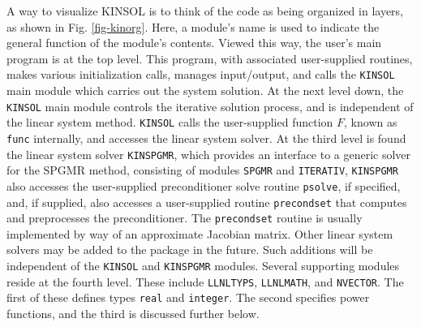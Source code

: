 A way to visualize KINSOL is to think of the code as being organized
in layers, as shown in Fig. \ref{fig-kinorg}. Here, a module's name is used
to indicate the general function of the module's contents. Viewed
this way, the user's main program is at the top level. This program, with
associated user-supplied routines, makes various initialization calls, manages 
input/output, and calls the {\tt KINSOL} main module which carries out the 
system solution. At the next level 
down, the {\tt KINSOL} main module controls the iterative solution process, 
and is independent of the linear system method. {\tt KINSOL} calls the 
user-supplied function $F$, known as {\tt func} internally, and accesses the 
linear system solver. At the third level is found the linear system solver 
{\tt KINSPGMR}, which provides an interface to a generic solver for the SPGMR 
method, consisting of modules {\tt SPGMR} and {\tt ITERATIV}, {\tt KINSPGMR} 
also accesses the user-supplied preconditioner solve routine {\tt psolve}, if 
specified, and, if supplied, also accesses a user-supplied routine 
{\tt precondset} that computes and preprocesses the preconditioner. The 
{\tt precondset} routine is usually implemented by way of an approximate 
Jacobian matrix. Other linear system solvers may be added to the package in the
future. Such additions will be independent of the {\tt KINSOL} and 
{\tt KINSPGMR} modules. Several supporting modules reside at the fourth level.
These include {\tt LLNLTYPS}, {\tt LLNLMATH}, and {\tt NVECTOR}. The first of 
these defines types {\tt real} and {\tt integer}. The second specifies power 
functions, and the third is discussed further below.

